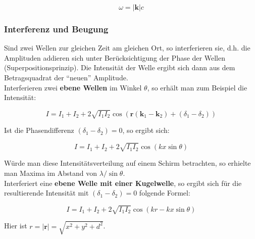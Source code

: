 $$ \omega = |\mathbf k|c$$

\subsubsection{Interferenz und Beugung}

Sind zwei Wellen zur gleichen Zeit am gleichen Ort, so interferieren sie, d.h. die Amplituden addieren sich unter Berücksichtigung der Phase der Wellen (Superpositionsprinzip). Die Intensität der Welle ergibt sich dann aus dem Betragsquadrat der "`neuen"' Amplitude.\\

Interferieren zwei \textbf{ebene Wellen} im Winkel $\theta$, so erhält man zum Beispiel die Intensität:

\begin{equation} I = I_1 + I_2 + 2\sqrt{I_1I_2}\cos{(\mathbf r(\mathbf k_1 - \mathbf k_2) + (\delta_1 - \delta_2))} \end{equation}

Ist die Phasendifferenz $(\delta_1 - \delta_2) = 0$, so ergibt sich:

\begin{equation} I = I_1 + I_2 + 2\sqrt{I_1I_2}\cos(kx\sin\theta) \end{equation}

Würde man diese Intensitätsverteilung auf einem Schirm betrachten, so erhielte man Maxima im Abstand von $\lambda/\sin\theta$.\\

Interferiert eine \textbf{ebene Welle mit einer Kugelwelle}, so ergibt sich für die resultierende Intensität mit $(\delta_1 - \delta_2) = 0$ folgende Formel:

\begin{equation} I = I_1 + I_2 + 2\sqrt{I_1I_2}\cos(kr-kx\sin\theta)  \end{equation}

Hier ist $r = |\mathbf r| = \sqrt{x^2+y^2+d^2}$.


